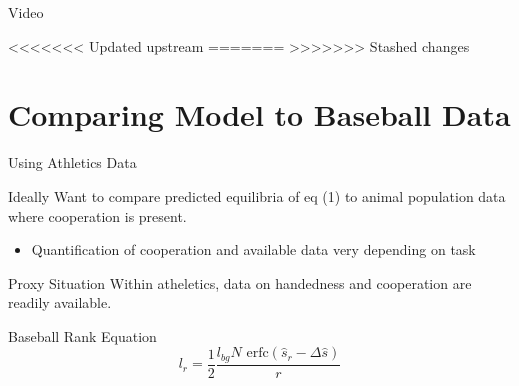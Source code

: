 \documentclass{beamer}
\begin{document}
    \begin{frame}{Video}
    
<<<<<<< Updated upstream
=======
>>>>>>> Stashed changes

    \end{frame}

\section{Comparing Model to Baseball Data}


    \begin{frame}{Using Athletics Data}
      \begin{block}{Ideally}
        Want to compare predicted equilibria of eq (1) to animal population data where cooperation is present.
        \begin{itemize}
            \item Quantification of cooperation and available data very depending on task 
          \end{itemize}  
      \end{block}
      \begin{block}{Proxy Situation}
        Within atheletics, data on handedness and cooperation are readily available.
      \end{block}
      \begin{block}{Baseball Rank Equation}
        \begin{equation}
        l_r = \frac{1}{2}\frac{l_{bg}N\text{ erfc}(\hat{s}_r-\Delta\hat{s})}{r}
      \end{equation}
      \end{block}
      
    \end{frame}
\end{document}
